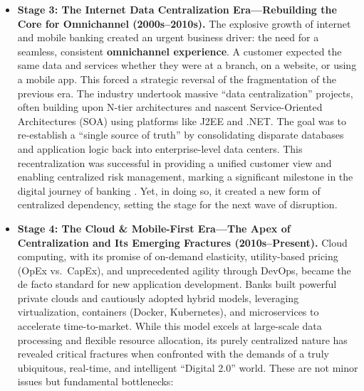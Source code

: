 \documentclass[11pt,a4paper]{article}
\begin{document}
\begin{itemize}
  \item \textbf{Stage 3: The Internet Data Centralization Era---Rebuilding the Core for Omnichannel (2000s--2010s).} The explosive growth of internet and mobile banking created an urgent business driver: the need for a seamless, consistent \textbf{omnichannel experience}. A customer expected the same data and services whether they were at a branch, on a website, or using a mobile app. This forced a strategic reversal of the fragmentation of the previous era. The industry undertook massive ``data centralization'' projects, often building upon N-tier architectures and nascent Service-Oriented Architectures (SOA) using platforms like J2EE and .NET. The goal was to re-establish a ``single source of truth'' by consolidating disparate databases and application logic back into enterprise-level data centers. This recentralization was successful in providing a unified customer view and enabling centralized risk management, marking a significant milestone in the digital journey of banking \cite{firat2023future}. Yet, in doing so, it created a new form of centralized dependency, setting the stage for the next wave of disruption.

  \item \textbf{Stage 4: The Cloud \& Mobile-First Era---The Apex of Centralization and Its Emerging Fractures (2010s--Present).} Cloud computing, with its promise of on-demand elasticity, utility-based pricing (OpEx vs.\ CapEx), and unprecedented agility through DevOps, became the de facto standard for new application development. Banks built powerful private clouds and cautiously adopted hybrid models, leveraging virtualization, containers (Docker, Kubernetes), and microservices to accelerate time-to-market. While this model excels at large-scale data processing and flexible resource allocation, its purely centralized nature has revealed critical fractures when confronted with the demands of a truly ubiquitous, real-time, and intelligent ``Digital 2.0'' world. These are not minor issues but fundamental bottlenecks:
\end{itemize}
\end{document}
